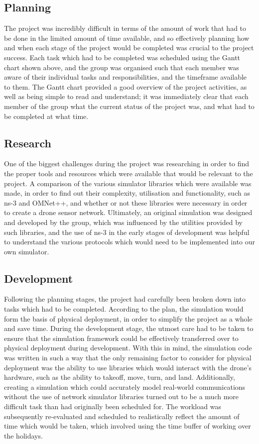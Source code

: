 \subsection{Planning}
The project was incredibly difficult in terms of the amount of work that had to be done in the limited amount of time available, and so effectively planning how and when each stage of the project would be completed was crucial to the project success. Each task which had to be completed was scheduled using the Gantt chart shown above, and the group was organised such that each member was aware of their individual tasks and responsibilities, and the timeframe available to them. The Gantt chart provided a good overview of the project activities, as well as being simple to read and understand; it was immediately clear that each member of the group what the current status of the project was, and what had to be completed at what time.
		\subsection{Research}
One of the biggest challenges during the project was researching in order to find the proper tools and resources which were available that would be relevant to the project. A comparison of the various simulator libraries which were available was made, in order to find out their complexity, utilisation and functionality, such as ns-3 and OMNet++, and whether or not these libraries were necessary in order to create a drone sensor network. Ultimately, an original simulation was designed and developed by the group, which was influenced by the utilities provided by such libraries, and the use of ns-3 in the early stages of development was helpful to understand the various protocols which would need to be implemented into our own simulator.
		\subsection{Development}
Following the planning stages, the project had carefully been broken down into tasks which had to be completed. According to the plan, the simulation would form the basis of physical deployment, in order to simplify the project as a whole and save time. During the development stage, the utmost care had to be taken to ensure that the simulation framework could be effectively transferred over to physical deployment during development. With this in mind, the simulation code was written in such a way that the only remaining factor to consider for physical deployment was the ability to use libraries which would interact with the drone’s hardware, such as the ability to takeoff, move, turn, and land. Additionally, creating a simulation which could accurately model real-world communications without the use of network simulator libraries turned out to be a much more difficult task than had originally been scheduled for. The workload was subsequently re-evaluated and scheduled to realistically reflect the amount of time which would be taken, which involved using the time buffer of working over the holidays.
